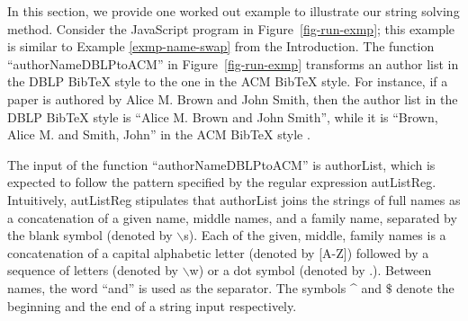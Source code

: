 In this section, we provide one worked out example to illustrate our string
solving method. 
Consider the JavaScript program in Figure~\ref{fig-run-exmp}; this example is
similar to Example \ref{exmp-name-swap} from the Introduction.
The function ``authorNameDBLPtoACM'' in 
Figure~\ref{fig-run-exmp} transforms %
an author list in the DBLP BibTeX style to the one in the ACM BibTeX style. For instance,  if a paper is authored by Alice M. Brown and John Smith, then the author list in the DBLP BibTeX style is ``Alice M. Brown and John Smith'', while it is ``Brown, Alice M. and Smith, John'' in the ACM BibTeX style . 

The input of the function ``authorNameDBLPtoACM'' is {\sf authorList}, which is expected to follow the pattern specified by the regular expression {\sf autListReg}. Intuitively, {\sf autListReg} stipulates that {\sf authorList} %
joins the strings of full names %
as a concatenation of a given name, middle names, and a family name, separated by the blank symbol (denoted by $\backslash$s). Each of the given, middle, family names is a concatenation of a capital alphabetic letter (denoted by [A-Z]) followed by a sequence of letters (denoted by $\backslash$w) or a dot symbol (denoted by $.$). Between names, the word ``and'' is used as the separator.
The symbols \^{} and $\$$ denote the beginning and the end of a string input respectively.

